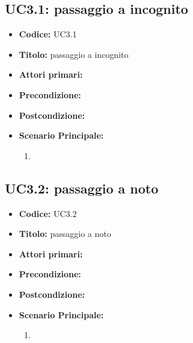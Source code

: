 ﻿\documentclass[../analisi-dei-requisiti]{subfiles}
\begin{document}
\subsection{UC3.1: passaggio a incognito}
\label{sub:uc3.1utente}
\begin{itemize}
  \item \textbf{Codice:} UC3.1
  \item \textbf{Titolo:} passaggio a incognito
  \item \textbf{Attori primari:}
  \item \textbf{Precondizione:}
  \item \textbf{Postcondizione:}
  \item \textbf{Scenario Principale:}
  \begin{enumerate}
    \item
  \end{enumerate}
\end{itemize}

\subsection{UC3.2: passaggio a noto}
\label{sub:uc3.2utente}
\begin{itemize}
  \item \textbf{Codice:} UC3.2
  \item \textbf{Titolo:} passaggio a noto
  \item \textbf{Attori primari:}
  \item \textbf{Precondizione:}
  \item \textbf{Postcondizione:}
  \item \textbf{Scenario Principale:}
  \begin{enumerate}
    \item
  \end{enumerate}
\end{itemize}
\end{document}
